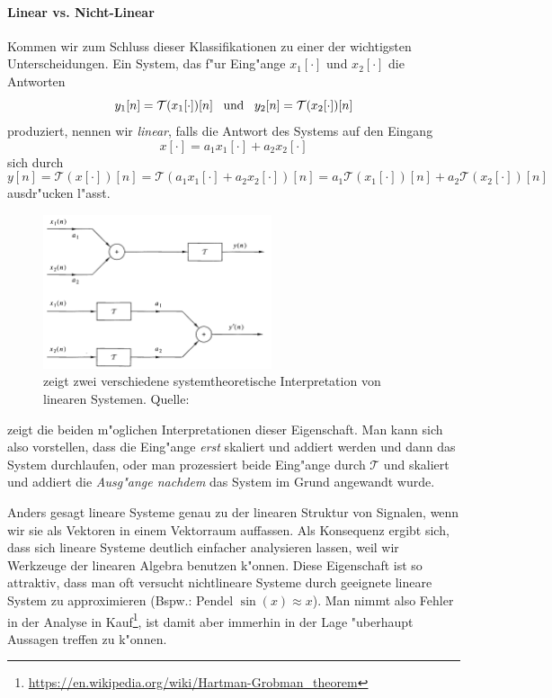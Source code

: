 \paragraph{Linear vs. Nicht-Linear} Kommen wir zum Schluss dieser Klassifikationen zu einer der wichtigsten Unterscheidungen.
Ein System, das f"ur Eing"ange $x_1[\cdot]$ und $x_2[\cdot]$ die Antworten
\[
    y_1[n] = \mathcal{T}(x_1[\cdot])[n]
    {\hspace{3mm} \text{und} \hspace{3mm}}
    y_2[n] = \mathcal{T}(x_2[\cdot])[n]
\]
produziert, nennen wir \emph{linear}, falls die Antwort des Systems auf den Eingang
\[
    x[\cdot] = a_1 x_1[\cdot] + a_2 x_2[\cdot]
\]
sich durch
\[
    y[n]
        = \mathcal{T}(x[\cdot])[n] 
        = \mathcal{T}(a_1 x_1[\cdot] + a_2 x_2[\cdot])[n] 
        = a_1 \mathcal{T}(x_1[\cdot])[n] 
            + a_2 \mathcal{T}(x_2[\cdot])[n] 
\]
ausdr"ucken l"asst.
%
\begin{figure}
    \centering\includegraphics[width=0.6\textwidth]{img/disc_sys/linear_sys.png}
    \caption{zeigt zwei verschiedene systemtheoretische Interpretation von linearen Systemen. Quelle: \cite{proakis2013}}\label{img:disc_sys:linear_sys}
\end{figure}
%

 zeigt die beiden m"oglichen Interpretationen dieser Eigenschaft.
Man kann sich also vorstellen, dass die Eing"ange \emph{erst} skaliert und addiert werden und dann das System durchlaufen, oder man prozessiert beide Eing"ange durch $\mathcal{T}$ und skaliert und addiert die \emph{Ausg"ange nachdem} das System im Grund  angewandt wurde.

Anders gesagt  lineare Systeme genau zu der linearen Struktur von Signalen, wenn wir sie als Vektoren in einem Vektorraum auffassen.
Als Konsequenz ergibt sich, dass sich lineare Systeme deutlich einfacher analysieren lassen, weil wir Werkzeuge der linearen Algebra benutzen k"onnen.
Diese Eigenschaft ist so attraktiv, dass man oft versucht nichtlineare Systeme durch geeignete lineare System zu approximieren (Bspw.: Pendel $\sin(x) \approx x$).
Man nimmt also Fehler in der Analyse in Kauf\footnote{\url{https://en.wikipedia.org/wiki/Hartman-Grobman_theorem}}, ist damit aber immerhin in der Lage "uberhaupt Aussagen treffen zu k"onnen.
%